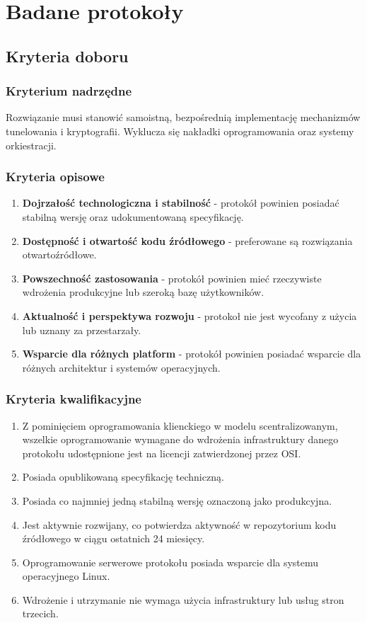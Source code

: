 \section{Badane protokoły}

\subsection{Kryteria doboru}

\subsubsection{Kryterium nadrzędne}
Rozwiązanie musi stanowić samoistną, bezpośrednią implementację mechanizmów tunelowania i kryptografii. Wyklucza się nakładki oprogramowania oraz systemy orkiestracji.

\subsubsection{Kryteria opisowe}

\begin{enumerate}[leftmargin=*]
    \item \textbf{Dojrzałość technologiczna i stabilność} - protokół powinien posiadać stabilną wersję oraz udokumentowaną specyfikację.
    \item \textbf{Dostępność i otwartość kodu źródłowego} - preferowane są rozwiązania otwartoźródłowe.
    \item \textbf{Powszechność zastosowania} - protokół powinien mieć rzeczywiste wdrożenia produkcyjne lub szeroką bazę użytkowników.
    \item \textbf{Aktualność i perspektywa rozwoju} - protokoł nie jest wycofany z użycia lub uznany za przestarzały.
    \item \textbf{Wsparcie dla różnych platform} - protokół powinien posiadać wsparcie dla różnych architektur i systemów operacyjnych.
\end{enumerate}

\subsubsection{Kryteria kwalifikacyjne}
\begin{enumerate}[leftmargin=*]
    \item Z pominięciem oprogramowania klienckiego w modelu scentralizowanym, wszelkie oprogramowanie wymagane do wdrożenia infrastruktury danego protokołu udostępnione jest na licencji zatwierdzonej przez OSI. \cite{53EK}
    \item Posiada opublikowaną specyfikację techniczną.
    \item Posiada co najmniej jedną stabilną wersję oznaczoną jako produkcyjna.
    \item Jest aktywnie rozwijany, co potwierdza aktywność w repozytorium kodu źródłowego w ciągu ostatnich 24 miesięcy.
    \item Oprogramowanie serwerowe protokołu posiada wsparcie dla systemu operacyjnego Linux.
    \item Wdrożenie i utrzymanie nie wymaga użycia infrastruktury lub usług stron trzecich.
\end{enumerate}

